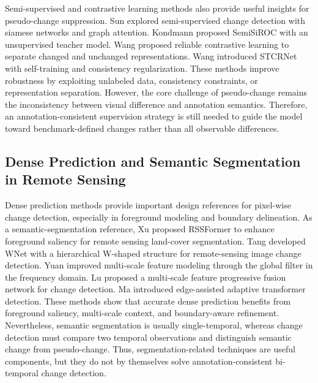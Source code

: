         Semi-supervised and contrastive learning methods also provide useful insights for pseudo-change suppression. Sun \etal explored semi-supervised change detection with siamese networks and graph attention\cite{semisanet}. Kondmann \etal proposed SemiSiROC\cite{SemiSiROC} with an unsupervised teacher model. Wang \etal proposed reliable contrastive learning to separate changed and unchanged representations\cite{contrastive-learning}. Wang \etal introduced STCRNet\cite{self-training} with self-training and consistency regularization. These methods improve robustness by exploiting unlabeled data, consistency constraints, or representation separation. However, the core challenge of pseudo-change remains the inconsistency between visual difference and annotation semantics. Therefore, an annotation-consistent supervision strategy is still needed to guide the model toward benchmark-defined changes rather than all observable differences.

    \subsection{Dense Prediction and Semantic Segmentation in Remote Sensing}\label{sec:RelatedWork:DensePrediction}
        Dense prediction methods provide important design references for pixel-wise change detection, especially in foreground modeling and boundary delineation. As a semantic-segmentation reference, Xu \etal proposed RSSFormer\cite{rssformer} to enhance foreground saliency for remote sensing land-cover segmentation. Tang \etal developed WNet\cite{wnet} with a hierarchical W-shaped structure for remote-sensing image change detection. Yuan \etal improved multi-scale feature modeling through the global filter in the frequency domain\cite{multi-scale}. Lu \etal proposed a multi-scale feature progressive fusion network for change detection\cite{multi}. Ma \etal introduced edge-assisted adaptive transformer detection\cite{ma2023eatder}. These methods show that accurate dense prediction benefits from foreground saliency, multi-scale context, and boundary-aware refinement. Nevertheless, semantic segmentation is usually single-temporal, whereas change detection must compare two temporal observations and distinguish semantic change from pseudo-change. Thus, segmentation-related techniques are useful components, but they do not by themselves solve annotation-consistent bi-temporal change detection.
